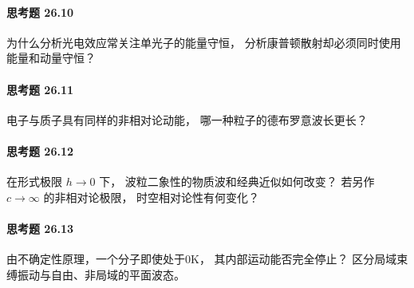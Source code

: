 \paragraph{思考题 26.10}
为什么分析光电效应常关注单光子的能量守恒，
分析康普顿散射却必须同时使用能量和动量守恒？
\paragraph{思考题 26.11}
电子与质子具有同样的非相对论动能，
哪一种粒子的德布罗意波长更长？
\paragraph{思考题 26.12}
在形式极限 \(h\to0\) 下，
波粒二象性的物质波和经典近似如何改变？
若另作 \(c\to\infty\) 的非相对论极限，
时空相对论性有何变化？
\paragraph{思考题 26.13}
由不确定性原理，一个分子即使处于0K，
其内部运动能否完全停止？
区分局域束缚振动与自由、非局域的平面波态。

